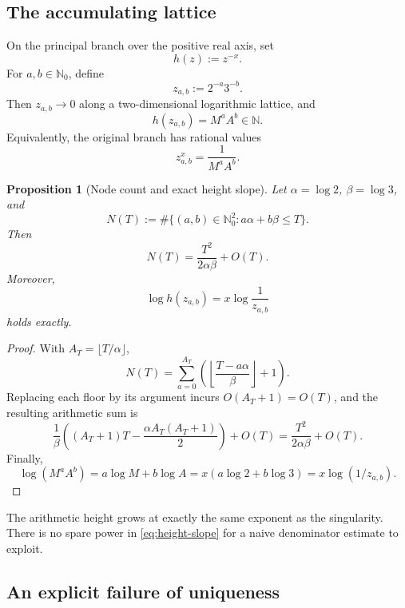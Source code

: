 \documentclass[11pt,oneside]{article}
\newtheorem{proposition}[theorem]{Proposition}
\theoremstyle{definition}
\theoremstyle{remark}
\newcommand{\N}{\mathbb N}
\newcommand{\Nzero}{\mathbb N_0}
\begin{document}
\subsection{The accumulating lattice}

On the principal branch over the positive real axis, set
\[
  h(z):=z^{-x}.
\]
For \(a,b\in\Nzero\), define
\begin{equation}
  z_{a,b}:=2^{-a}3^{-b}.
  \label{eq:nodes-recip}
\end{equation}
Then \(z_{a,b}\to0\) along a two-dimensional logarithmic lattice, and
\begin{equation}
  h(z_{a,b})=M^aA^b\in\N.
  \label{eq:integer-puncture-values}
\end{equation}
Equivalently, the original branch has rational values
\[
  z_{a,b}^{x}=\frac1{M^aA^b}.
\]

\begin{proposition}[Node count and exact height slope]
\label{prop:node-count}
Let \(\alpha=\log2\), \(\beta=\log3\), and
\[
  N(T):=\#\{(a,b)\in\Nzero^2:a\alpha+b\beta\le T\}.
\]
Then
\begin{equation}
  N(T)=\frac{T^2}{2\alpha\beta}+O(T).
  \label{eq:node-count}
\end{equation}
Moreover,
\begin{equation}
  \log h(z_{a,b})
  =x\log\frac1{z_{a,b}}
  \label{eq:height-slope}
\end{equation}
holds exactly.
\end{proposition}

\begin{proof}
With \(A_T=\lfloor T/\alpha\rfloor\),
\[
N(T)=\sum_{a=0}^{A_T}
\left(\left\lfloor\frac{T-a\alpha}{\beta}\right\rfloor+1\right).
\]
Replacing each floor by its argument incurs \(O(A_T+1)=O(T)\), and the resulting arithmetic sum is
\[
 \frac1\beta\left((A_T+1)T-\frac{\alpha A_T(A_T+1)}2\right)+O(T)
 =\frac{T^2}{2\alpha\beta}+O(T).
\]
Finally,
\[
\log(M^aA^b)
=a\log M+b\log A
=x(a\log2+b\log3)
=x\log(1/z_{a,b}).
\]
\end{proof}

The arithmetic height grows at exactly the same exponent as the singularity.  There is no spare power in \eqref{eq:height-slope} for a naive denominator estimate to exploit.

\subsection{An explicit failure of uniqueness}
\end{document}
